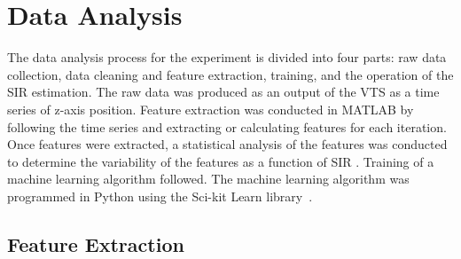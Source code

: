 	\section{Data Analysis}\label{ftml:sec:dataanalysis}
	
	
	The data analysis process for the experiment
	is divided into four parts: raw data collection, data cleaning and feature extraction, training, and the operation of the SIR estimation. The raw data was produced as an output of the VTS as a time series of z-axis position. Feature extraction was conducted in MATLAB by following the time series and extracting or calculating features for each iteration.  Once features were extracted, a statistical analysis of the features was conducted to determine the variability of the features as a function of SIR \cite{Candell_ISIT_2019}. Training of a machine learning algorithm followed. The machine learning algorithm was programmed in Python using the Sci-kit Learn library~\cite{SCIKITLEARN}.
	
	\subsection{Feature Extraction}\label{ftml:sec:data:feats}
	


